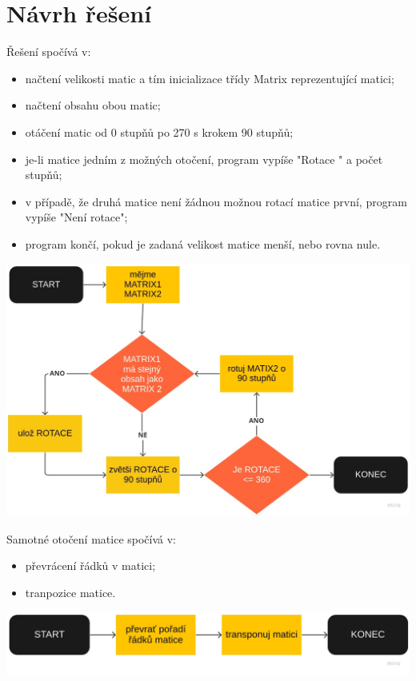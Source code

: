 \documentclass[a4paper,12pt]{article}
\begin{document}
\section{Návrh řešení}
     Řešení spočívá v:
     \begin{itemize}
          \item načtení velikosti matic a tím inicializace třídy Matrix reprezentující matici;
          \item načtení obsahu obou matic;
          \item otáčení matic od 0 stupňů po 270 s krokem 90 stupňů;
          \item je-li matice jedním z možných otočení, program vypíše "Rotace " a počet stupňů;
          \item v případě, že druhá matice není žádnou možnou rotací matice první, program vypíše "Není rotace";
          \item program končí, pokud je zadaná velikost matice menší, nebo rovna nule.
     \end{itemize}
     \includegraphics[scale=0.36]{alg1-flowchart}

     Samotné otočení matice spočívá v:
     \begin{itemize}
          \item převrácení řádků v matici;
          \item tranpozice matice.
     \end{itemize}

     \includegraphics[scale=0.18]{alg1-rotate-flowchart}
\end{document}
